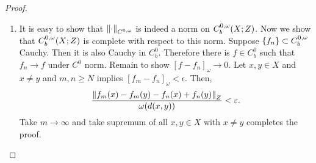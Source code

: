 \documentclass[a4paper]{article}
\begin{document}
{\begin{proof}
\begin{enumerate}
\item It is easy to show that $\left\lVert \cdot\right\rVert_{{C^{0, \omega}}}$ is indeed a
norm on ${C^{0, \omega}_b}(X; Z)$. Now we show that ${C^{0, \omega}_b}(X; Z)$
is complete with respect to this norm.
Suppose $\left\{ f_n \right\} \subset {C^{0, \omega}_b}$ Cauchy. Then 
it is also Cauchy in $C^0_b$. Therefore there is $f \in C^0_b$
such that $f_n \to f$ under $C^0$ norm. Remain to show 
$[f - f_n]_\omega \to 0$. Let $x, y \in X$ and $x \neq y$
and $m, n \geq N$ implies $[f_m - f_n]_\omega < \epsilon$.
Then, 
\[
\begin{aligned}
  \frac{\left\lVert f_m(x) - f_m(y) - f_n(x) + f_n(y)\right\rVert_Z}{\omega(d(x, y))}
  < \varepsilon.
\end{aligned}
\]
Take $m \to \infty$ and take supremum of all 
$x, y \in X$ with $x \neq y$
completes the proof.


\end{enumerate}
\end{proof}
}
\end{document}
